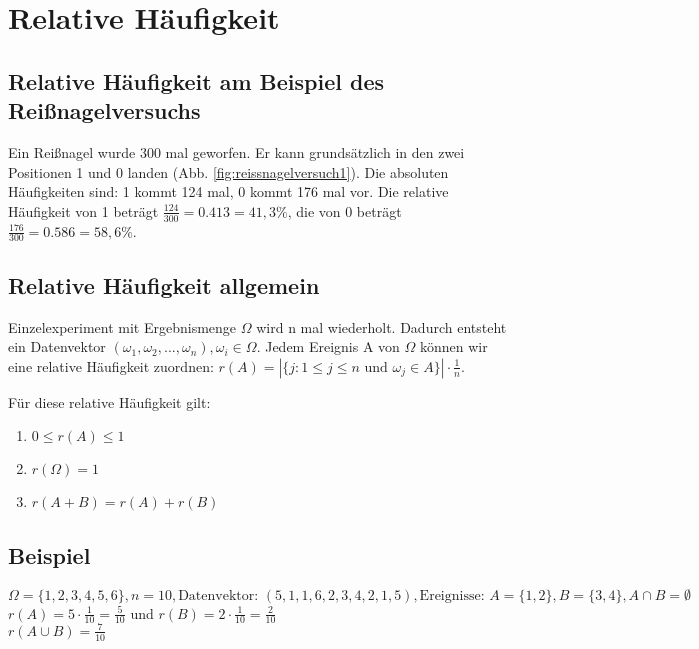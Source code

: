 \renewcommand{\ldate}{2015-10-06}

\section{Relative Häufigkeit}

\subsection{Relative Häufigkeit am Beispiel des Reißnagelversuchs}
Ein Reißnagel wurde 300 mal geworfen. Er kann grundsätzlich in den zwei Positionen 1 und 0 landen (Abb. \ref{fig:reissnagelversuch1}). Die absoluten Häufigkeiten sind: 1 kommt 124 mal, 0 kommt 176 mal vor. Die relative Häufigkeit von 1 beträgt $ \frac{124}{300}=0.413=41,3\% $, die von 0 beträgt $ \frac{176}{300}=0.586=58,6\% $.


\subsection{Relative Häufigkeit allgemein}
Einzelexperiment mit Ergebnismenge $ \Omega $ wird n mal wiederholt. Dadurch entsteht ein Datenvektor $ (\omega_1, \omega_2, ..., \omega_n), \omega_i \in \Omega $.  Jedem Ereignis A von $ \Omega $ können wir eine relative Häufigkeit zuordnen: $ r(A) = |\{ j : 1\leq j\leq n \textrm{ und } \omega_j \in A \}| \cdot \frac{1}{n} $. 

Für diese relative Häufigkeit gilt: 
\begin{enumerate}
\item $ 0\leq r(A)\leq 1 $
\item $ r(\Omega) = 1 $
\item $ r(A+B) = r(A) + r(B) $
\end{enumerate}

\subsection{Beispiel}
$ \Omega = \{ 1,2,3,4,5,6 \}, n=10, \textrm{Datenvektor: } (5,1,1,6,2,3,4,2,1,5), \textrm{Ereignisse: } A=\{ 1,2 \}, B=\{ 3,4 \}, A\cap B=\emptyset $\\
$ r(A) = 5 \cdot \frac{1}{10} = \frac{5}{10} $ und $ r(B)=2\cdot \frac{1}{10}=\frac{2}{10} $\\
$ r(A\cup B) = \frac{7}{10} $

